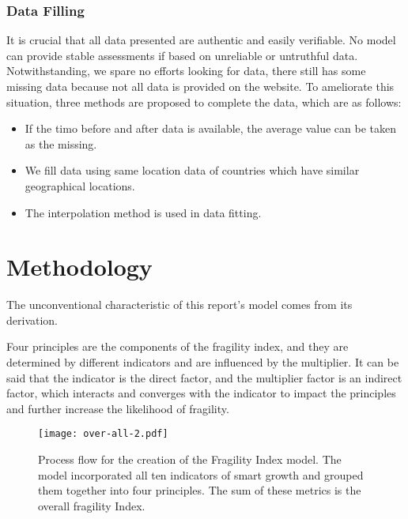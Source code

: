 \documentclass{mcmthesis}
\begin{document}
			\subsubsection{Data Filling}
				
				It is crucial that all data presented are authentic and easily verifiable. No model can provide stable assessments if based on unreliable or untruthful data. Notwithstanding, we spare no efforts looking for data, there still has some missing data because not all data is provided on the website. To ameliorate this situation, three methods are proposed to complete the data, which are as follows:
				
				\begin{itemize}
					\item If the timo before and after data is available, the average value can be taken as the missing.
					
					\item We fill data using same location data of countries which have similar geographical locations.
					
					\item The interpolation method is used in data fitting.
					
				\end{itemize}
			
	
	\section{Methodology}
	
		The unconventional characteristic of this report's model comes from its derivation. 
		
		Four principles are the components of the fragility index, and they are determined by different indicators and are influenced by the multiplier. It can be said that the indicator is the direct factor, and the multiplier factor is an indirect factor, which interacts and converges with the indicator to impact the principles and further increase the likelihood of fragility.
		
		
		\begin{figure}[h]
			\small
			\centering
			\texttt{[image: over-all-2.pdf]}
			\caption{Process flow for the creation of the Fragility Index model. The model incorporated all ten indicators of smart growth and grouped them together into four principles. The sum of these metrics is the overall fragility Index.}
			\label{fig:over-all-2}
		\end{figure}
	
\end{document}
